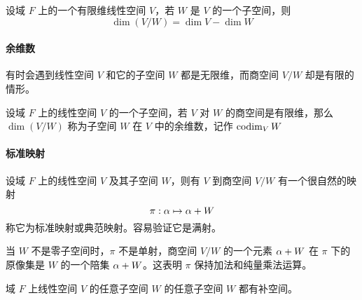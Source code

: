 \begin{theorem}
    设域 $F$ 上的一个有限维线性空间 $V$，若 $W$ 是 $V$ 的一个子空间，则
    \[ \dim(V/W) = \dim V - \dim W \]
\end{theorem}

\paragraph{余维数}

有时会遇到线性空间 $V$ 和它的子空间 $W$ 都是无限维，而商空间 $V/W$ 却是有限的情形。

\begin{definition}
    设域 $F$ 上的线性空间 $V$ 的一个子空间，若 $V$ 对 $W$ 的商空间是有限维，那么 $\dim(V/W)$ 称为子空间 $W$ 在 $V$ 中的余维数，记作 $\operatorname{codim}_V W$
\end{definition}

\paragraph{标准映射}

设域 $F$ 上的线性空间 $V$ 及其子空间 $W$，则有 $V$ 到商空间 $V/W$ 有一个很自然的映射
\[ \pi : \alpha \mapsto \alpha + W \]
称它为标准映射或典范映射。容易验证它是满射。

当 $W$ 不是零子空间时，$\pi$ 不是单射，商空间 $V/W$ 的一个元素 $\alpha + W$ 在 $\pi$ 下的原像集是 $W$ 的一个陪集 $\alpha + W$。这表明 $\pi$ 保持加法和纯量乘法运算。

\begin{theorem}
    域 $F$ 上线性空间 $V$ 的任意子空间 $W$ 的任意子空间 $W$ 都有补空间。
\end{theorem}


